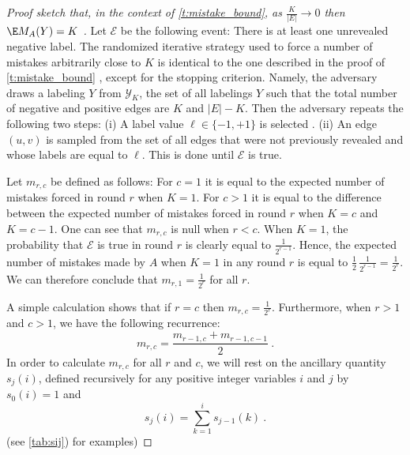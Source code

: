 \begin{proof}[Proof sketch that, in the context of \autoref{t:mistake_bound}, as $\frac{K}{|E|}
  \rightarrow 0$ then $\E M_A(Y)=K$  ]

Let $\mathcal{E}$ be the following event: There is at least one unrevealed negative label.
The randomized iterative strategy used to force a number of mistakes arbitrarily close to $K$ is identical to the one described
in the proof of \autoref{t:mistake_bound} , except for the stopping criterion.
Namely, the adversary draws a labeling $Y$ \uar{} from $\mathcal{Y}_K$, the set of all labelings $Y$
such that the total number of negative and positive edges are $K$ and $|E|-K$. Then the adversary
repeats the following two steps: (i) A label value $\ell\in\{-1,+1\}$ is selected \uar{}. (ii) An
edge $(u,v)$ is sampled \uar{} from the set of all edges that were not previously revealed and whose
labels are equal to $\ell$. This is done until $\mathcal{E}$ is true.

Let $m_{r,c}$ be defined as follows: For $c=1$ it is equal to the expected number of mistakes forced
in round $r$ when $K=1$. For $c > 1$ it is equal to the difference between the expected number of
mistakes forced in round $r$ when $K=c$ and $K=c-1$. One can see that $m_{r,c}$ is 
null when $r<c$. 
%
When $K=1$, the probability that $\mathcal{E}$ is true in round $r$ is clearly equal to
$\frac{1}{2^{r-1}}$.
Hence, the expected number of mistakes made by $A$ when $K=1$ in any round $r$ is equal to 
\(
\frac{1}{2}\,\frac{1}{2^{r-1}} = \frac{1}{2^{r}}.
\)
We can therefore conclude that $m_{r,1}=\frac{1}{2^{r}}$ for all $r$.

A simple calculation shows that if $r=c$ then $m_{r,c}=\frac{1}{2^r}$. Furthermore, when $r>1$ and $c>1$, 
we have the following recurrence:
\[
m_{r,c}=\frac{m_{r-1,c}+m_{r-1,c-1}}{2}~.
\]  
In order to calculate $m_{r,c}$ for all $r$ and $c$, we will rest on the ancillary quantity
$s_j(i)$, defined recursively for any positive integer variables $i$ and $j$ by
$ s_0(i)=1 $
and
\[
s_j(i)=\sum_{k=1}^i s_{j-1}(k)~.
\]
(see \autoref{tab:sij}) for examples)



\end{proof}
